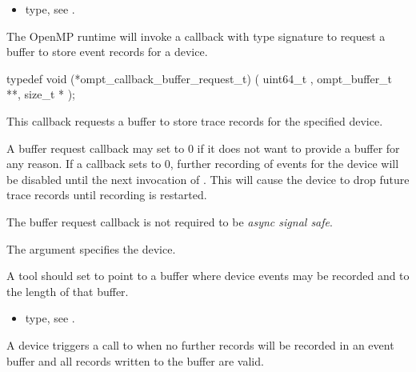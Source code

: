 \crossreferences
\begin{itemize}
\item {} type, see
.
\end{itemize}


\label{sec:ompt_callback_buffer_request_t}

\summary
The OpenMP runtime will invoke a callback with type signature
 to request a
buffer to store event records for a device.

\format

\begin{ccppspecific}
\begin{omptCallback}
typedef void (*ompt_callback_buffer_request_t) (
  uint64_t ,
  ompt_buffer_t **,
  size_t *
);
\end{omptCallback}
\end{ccppspecific}


\descr
This callback requests a buffer to store trace records for the
specified device.

A buffer request callback may set  to 0 if it does not
want to provide a buffer for any reason. If a callback sets
 to 0, further recording of events for the device will be
disabled until the next invocation of .  This
will cause the device to drop future trace records until recording is
restarted.

The buffer request callback is not required to be \emph{async signal safe}.

\argdesc

The argument  specifies the device.

A tool should set  to point to a buffer where device events
may be recorded and  to the length of that buffer.

\crossreferences
\begin{itemize}
\item {} type, see
.
\end{itemize}

\label{sec:ompt_callback_buffer_complete_t}
\summary
A device triggers a call to  when no further records will be recorded in an event buffer and all records written to the buffer are valid.

